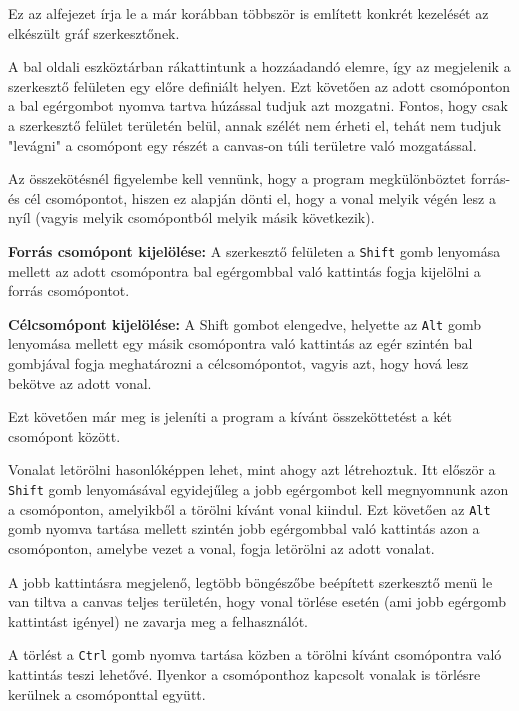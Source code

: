 Ez az alfejezet írja le a már korábban többször is említett konkrét kezelését az elkészült gráf szerkesztőnek.


A bal oldali eszköztárban rákattintunk a hozzáadandó elemre, így az megjelenik a szerkesztő felületen egy előre definiált helyen. Ezt követően az adott csomóponton a bal egérgombot nyomva tartva húzással tudjuk azt mozgatni. Fontos, hogy csak a szerkesztő felület területén belül, annak szélét nem érheti el, tehát nem tudjuk "levágni" a csomópont egy részét a canvas-on túli területre való mozgatással.


Az összekötésnél figyelembe kell vennünk, hogy a program megkülönböztet forrás- és cél csomópontot, hiszen ez alapján dönti el, hogy a vonal melyik végén lesz a nyíl (vagyis melyik csomópontból melyik másik következik).

\textbf{Forrás csomópont kijelölése:} A szerkesztő felületen a \texttt{Shift} gomb lenyomása mellett az adott csomópontra bal egérgombbal való kattintás fogja kijelölni a forrás csomópontot.

\textbf{Célcsomópont kijelölése:} A Shift gombot elengedve, helyette az \texttt{Alt} gomb lenyomása mellett egy másik csomópontra való kattintás az egér szintén bal gombjával fogja meghatározni a célcsomópontot, vagyis azt, hogy hová lesz bekötve az adott vonal.

Ezt követően már meg is jeleníti a program a kívánt összeköttetést a két csomópont között.


Vonalat letörölni hasonlóképpen lehet, mint ahogy azt létrehoztuk. Itt először a \texttt{Shift} gomb lenyomásával egyidejűleg a jobb egérgombot kell megnyomnunk azon a csomóponton, amelyikből a törölni kívánt vonal kiindul. Ezt követően az \texttt{Alt} gomb nyomva tartása mellett szintén jobb egérgombbal való kattintás azon a csomóponton, amelybe vezet a vonal, fogja letörölni az adott vonalat.

A jobb kattintásra megjelenő, legtöbb böngészőbe beépített szerkesztő menü le van tiltva a canvas teljes területén, hogy vonal törlése esetén (ami jobb egérgomb kattintást igényel) ne zavarja meg a felhasználót.


A törlést a \texttt{Ctrl} gomb nyomva tartása közben a törölni kívánt csomópontra való kattintás teszi lehetővé. Ilyenkor a csomóponthoz kapcsolt vonalak is törlésre kerülnek a csomóponttal együtt.

